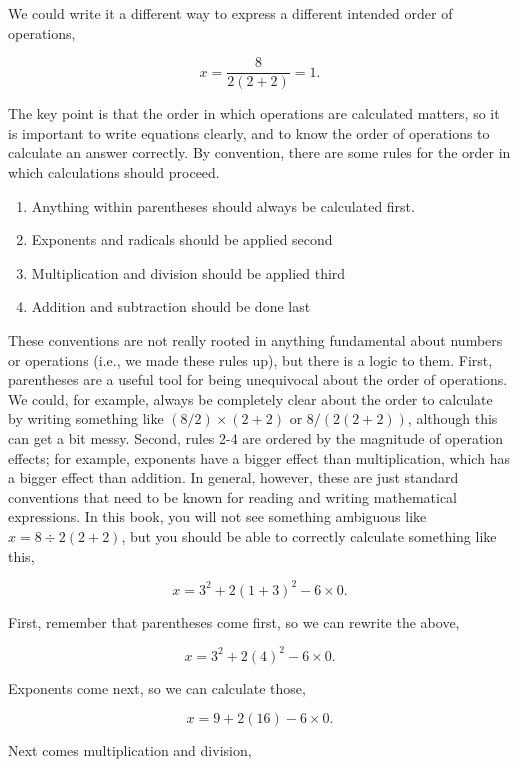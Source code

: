 \documentclass[
  openany]{scrbook}
\providecommand{\tightlist}{%
  \setlength{\itemsep}{0pt}\setlength{\parskip}{0pt}}
\begin{document}
We could write it a different way to express a different intended order of operations,

\[x = \frac{8}{2(2+2)} = 1.\]

The key point is that the order in which operations are calculated matters, so it is important to write equations clearly, and to know the order of operations to calculate an answer correctly.
By convention, there are some rules for the order in which calculations should proceed.

\begin{enumerate}
\def\labelenumi{\arabic{enumi}.}
\tightlist
\item
  Anything within parentheses should always be calculated first.
\item
  Exponents and radicals should be applied second
\item
  Multiplication and division should be applied third
\item
  Addition and subtraction should be done last
\end{enumerate}

These conventions are not really rooted in anything fundamental about numbers or operations (i.e., we made these rules up), but there is a logic to them.
First, parentheses are a useful tool for being unequivocal about the order of operations.
We could, for example, always be completely clear about the order to calculate by writing something like \((8/2) \times (2+2)\) or \(8 / (2(2 + 2))\), although this can get a bit messy.
Second, rules 2-4 are ordered by the magnitude of operation effects; for example, exponents have a bigger effect than multiplication, which has a bigger effect than addition.
In general, however, these are just standard conventions that need to be known for reading and writing mathematical expressions.
In this book, you will not see something ambiguous like \(x = 8 \div 2\left(2+2\right)\), but you should be able to correctly calculate something like this,

\[x = 3^{2} + 2\left(1 + 3\right)^{2} - 6 \times 0.\]

First, remember that parentheses come first, so we can rewrite the above,

\[x = 3^{2} + 2\left(4\right)^{2} - 6 \times 0.\]

Exponents come next, so we can calculate those,

\[x = 9 + 2\left(16\right) - 6 \times 0.\]

Next comes multiplication and division,
\end{document}
